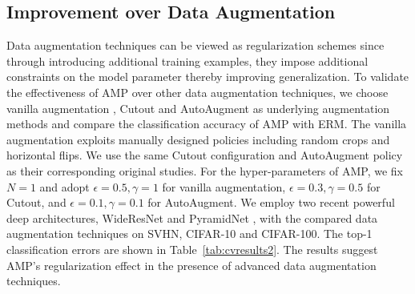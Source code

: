 \documentclass[final]{cvpr}
\begin{document}
\subsection{Improvement over Data Augmentation}\label{sec:augment}

Data augmentation techniques can be viewed as regularization schemes since through introducing additional training examples, they impose additional constraints on the model parameter thereby improving generalization. To validate the effectiveness of AMP over other data augmentation techniques, we choose vanilla augmentation \cite{krizhevsky2012imagenet}, Cutout \cite{devries2017improved} and AutoAugment \cite{cubuk2019autoaugment} as underlying augmentation methods and compare the classification accuracy of AMP with ERM. The vanilla augmentation exploits manually designed policies including random crops and horizontal flips. We use the same Cutout configuration and AutoAugment policy as their corresponding original studies. For the hyper-parameters of AMP, we fix $N=1$ and adopt $\epsilon=0.5,\gamma=1$ for vanilla augmentation, $\epsilon=0.3,\gamma=0.5$ for Cutout, and $\epsilon=0.1,\gamma=0.1$ for AutoAugment. We employ two recent powerful deep architectures, WideResNet \cite{zagoruyko2016wide} and PyramidNet \cite{han2017pyramid}, with the compared data augmentation techniques on SVHN, CIFAR-10 and CIFAR-100. The top-1 classification errors are shown in Table~\ref{tab:cvresults2}. The results suggest AMP's regularization effect in the presence of advanced data augmentation techniques.
\end{document}
